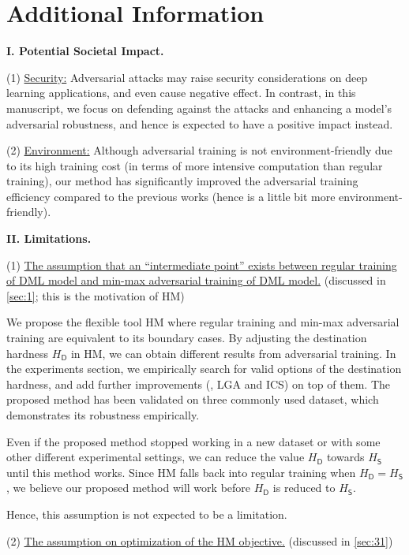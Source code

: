 \clearpage
\appendix

\section{Additional Information}

\noindent\textbf{I. Potential Societal Impact.}

(1) \ul{Security:} Adversarial attacks may raise security considerations on
deep learning applications, and even cause negative effect.
%
In contrast, in this manuscript, we focus on defending against the attacks and
enhancing a model's adversarial robustness, and hence is expected to have a
positive impact instead.

(2) \ul{Environment:} Although adversarial training is not
environment-friendly due to its high training cost (in terms of more intensive
computation than regular training), our method has significantly improved the
adversarial training efficiency compared to the previous works (hence is a
little bit more environment-friendly).

\noindent\textbf{II. Limitations.}

(1) \ul{The assumption that an ``intermediate point'' exists between regular
training of DML model and min-max adversarial training of DML model.}
(discussed in \cref{sec:1}; this is the motivation of HM)

We propose the flexible tool HM where regular training and min-max adversarial
training are equivalent to its boundary cases.
%
By adjusting the destination hardness $H_\mathsf{D}$ in HM, we can obtain
different results from adversarial training.
%
In the experiments section, we empirically search for valid options of the
destination hardness, and add further improvements (\ie, LGA and ICS) on top of
them.
%
The proposed method has been validated on three commonly used dataset, which
demonstrates its robustness empirically.

Even if the proposed method stopped working in a new dataset or with some other
different experimental settings, we can reduce
the value $H_\mathsf{D}$ towards $H_\mathsf{S}$ until this method works.
%
Since HM falls back into regular training when $H_\mathsf{D}=H_\mathsf{S}$,
we believe our proposed method will work before $H_\mathsf{D}$ is reduced
to $H_\mathsf{S}$.

Hence, this assumption is not expected to be a limitation.

(2) \ul{The assumption on optimization of the HM objective.}
(discussed in \cref{sec:31})


